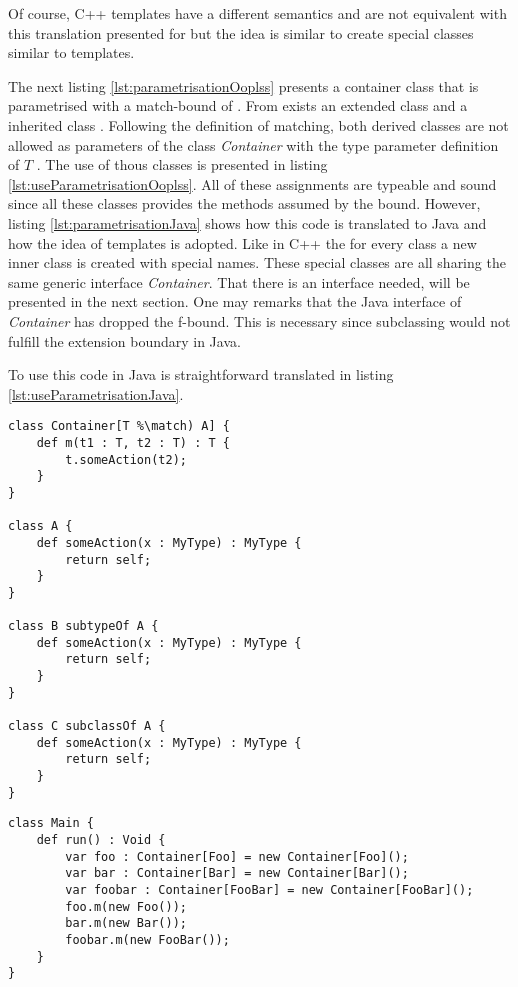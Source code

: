 Of course, C++ templates have a different semantics and are not equivalent
with this translation presented for \ooplss but the idea is similar to
create special classes similar to templates.

The next listing \ref{lst:parametrisationOoplss} presents a container
class that is parametrised with a match-bound of \A. From \A exists an
extended class \B and a inherited class \C. Following the definition
of matching, both derived classes are not allowed as parameters
of the class \emph{Container} with the type parameter definition
of $T$ \match \A.  The use of thous classes is presented in listing
\ref{lst:useParametrisationOoplss}. All of these assignments are typeable
and sound since all these classes provides the methods assumed by the
bound. However, listing \ref{lst:parametrisationJava} shows how this code
is translated to Java and how the idea of templates is adopted. Like
in C++ the for every class a new inner class is created with special
names. These special classes are all sharing the same generic interface
\emph{Container}. That there is an interface needed, will be presented
in the next section. One may remarks that the Java interface of
\emph{Container} has dropped the f-bound. This is necessary since
subclassing would not fulfill the extension boundary in Java.

 To use this code in Java is straightforward translated in listing
\ref{lst:useParametrisationJava}.

\begin{lstlisting}[float,language=ooplss,caption=Parametrisation in \ooplss,label=lst:parametrisationOoplss]
class Container[T %\match) A] {
	def m(t1 : T, t2 : T) : T {
		t.someAction(t2);
	}
}

class A {
	def someAction(x : MyType) : MyType {
		return self;
	}
}

class B subtypeOf A {
	def someAction(x : MyType) : MyType {
		return self;
	}
}

class C subclassOf A {
	def someAction(x : MyType) : MyType {
		return self;
	}
}
\end{lstlisting}

\begin{lstlisting}[float,language=ooplss,caption=Valid use of a match-bound container,label=lst:useParametrisationOoplss]
class Main {
	def run() : Void {
		var foo : Container[Foo] = new Container[Foo]();
		var bar : Container[Bar] = new Container[Bar]();
		var foobar : Container[FooBar] = new Container[FooBar]();
		foo.m(new Foo());
		bar.m(new Bar());
		foobar.m(new FooBar());
	}
}
\end{lstlisting}

